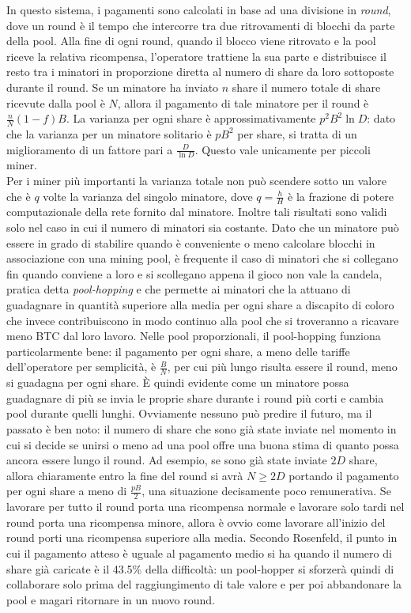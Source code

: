 In questo sistema, i pagamenti sono calcolati in base ad una divisione in \emph{round}, dove un round è il tempo che intercorre tra due ritrovamenti di blocchi da parte della pool. Alla fine di ogni round, quando il blocco viene ritrovato e la pool riceve la relativa ricompensa, l'operatore trattiene la sua parte e distribuisce il resto tra i minatori in proporzione diretta al numero di share da loro sottoposte durante il round. Se un minatore ha inviato $n$ share il numero totale di share ricevute dalla pool è $N$, allora il pagamento di tale minatore per il round è $\frac{n}{N}(1-f)B$.
La varianza per ogni share è approssimativamente $p^2 B^2 \ln{D}$: dato che la varianza per un minatore solitario è $pB^2$ per share, si tratta di un miglioramento di un fattore pari a $\frac{D}{\ln{D}}$. Questo vale unicamente per piccoli miner.\\Per i miner più importanti la varianza totale non può scendere sotto un valore che è $q$ volte la varianza del singolo minatore, dove $q=\frac{h}{H}$ è la frazione di potere computazionale della rete fornito dal minatore.
Inoltre tali risultati sono validi solo nel caso in cui il numero di minatori sia costante. Dato che un minatore può essere in grado di stabilire quando è conveniente o meno calcolare blocchi in associazione con una mining pool, è frequente il caso di minatori che si collegano fin quando conviene a loro e si scollegano appena il gioco non vale la candela, pratica detta \emph{pool-hopping} e che permette ai minatori che la attuano di guadagnare in quantità superiore alla media per ogni share a discapito di coloro che invece contribuiscono in modo continuo alla pool che si troveranno a ricavare meno BTC dal loro lavoro.
Nelle pool proporzionali, il pool-hopping funziona particolarmente bene: il pagamento per ogni share, a meno delle tariffe dell'operatore per semplicità, è $\frac{B}{N}$, per cui più lungo risulta essere il round, meno si guadagna per ogni share. È quindi evidente come un minatore possa guadagnare di più se invia le proprie share durante i round più corti e cambia pool durante quelli lunghi.
Ovviamente nessuno può predire il futuro, ma il passato è ben noto: il numero di share che sono già state inviate nel momento in cui si decide se unirsi o meno ad una pool offre una buona stima di quanto possa ancora essere lungo il round. Ad esempio, se sono già state inviate $2D$ share, allora chiaramente entro la fine del round si avrà $N \geq 2D$ portando il pagamento per ogni share a meno di $\frac{pB}{2}$, una situazione decisamente poco remunerativa.
Se lavorare per tutto il round porta una ricompensa normale e lavorare solo tardi nel round porta una ricompensa minore, allora è ovvio come lavorare all'inizio del round porti una ricompensa superiore alla media. Secondo Rosenfeld, il punto in cui il pagamento atteso è uguale al pagamento medio si ha quando il numero di share già caricate è il 43.5\% della difficoltà: un pool-hopper si sforzerà quindi di collaborare solo prima del raggiungimento di tale valore e per poi abbandonare la pool e magari ritornare in un nuovo round.

